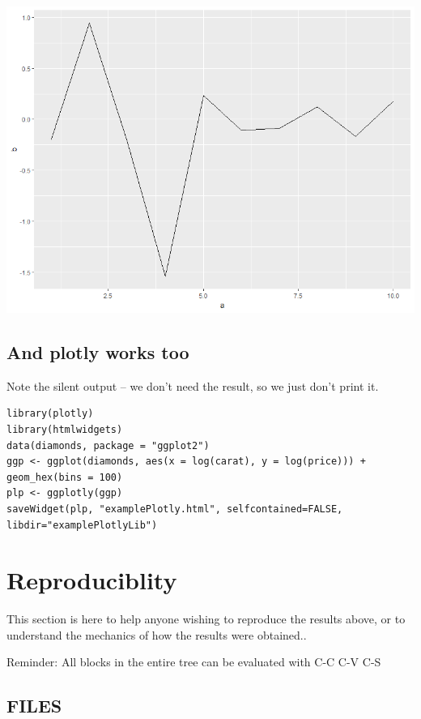 \documentclass[11pt]{article}
\begin{document}
\begin{center}
\includegraphics[width=.9\linewidth]{rOut1.png}
\end{center}

\subsection{And plotly works too}
\label{sec:org939eba7}

Note the silent output -- we don't need the result, so we just don't print it.

\begin{verbatim}
library(plotly)
library(htmlwidgets)
data(diamonds, package = "ggplot2")
ggp <- ggplot(diamonds, aes(x = log(carat), y = log(price))) + geom_hex(bins = 100)
plp <- ggplotly(ggp)
saveWidget(plp, "examplePlotly.html", selfcontained=FALSE, libdir="examplePlotlyLib")
\end{verbatim}

\section{Reproduciblity}
\label{sec:org4fc55ae}

This section is here to help anyone wishing to reproduce the results above, or to understand the mechanics of how the results were obtained..

Reminder: All blocks in the entire tree can be evaluated with C-C C-V C-S

\subsection{FILES}
\label{sec:org9944178}
\end{document}
